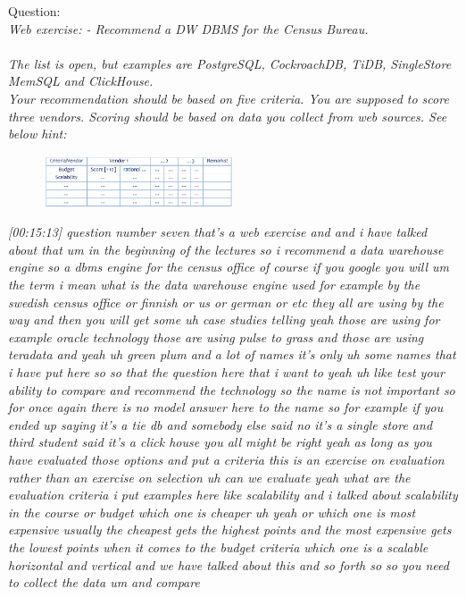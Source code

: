 Question:\\
\emph{
    Web exercise:
- Recommend a DW DBMS for the Census Bureau.\\\\ The list is open, but examples
are PostgreSQL, CockroachDB, TiDB, SingleStore MemSQL and ClickHouse.\\ Your
recommendation should be based on five criteria. You are supposed to score
three vendors. Scoring should be based on data you collect from web sources.
See below hint:
}

\begin{figure}[h] %
    \centering
    \includegraphics[width=0.5\textwidth]{Figures/Q7_QUESTION_table.PNG}
    \label{fig:my_image}
\end{figure}

\emph{[00:15:13] question number seven that's a web exercise and and i have talked about that
um in the beginning of the lectures so i recommend a data warehouse engine so a dbms engine for the
census office of course if you google you will um the term i mean what is the data warehouse engine used
for example by the swedish census office or finnish or us or german or etc they all are using by the way
and then you will get some uh case studies telling yeah those are using for example oracle technology
those are using pulse to grass and those are using teradata and yeah uh green plum and a lot of names
it's only uh some names that i have put here so so that the question here that i want to
yeah uh like test your ability to compare and recommend the technology so the name is not important so for
once again there is no model answer here to the name so for example if you ended up saying it's a tie db
and somebody else said no it's a single store and third student said it's a click house you all might
be right yeah as long as you have evaluated those options and put a criteria this is an exercise on
evaluation rather than an exercise on selection uh can we evaluate yeah what are the evaluation criteria
i put examples here like scalability and i talked about scalability in the course
or budget which one is cheaper uh yeah or which one is most expensive usually the cheapest gets the
highest points and the most expensive gets the lowest points when it comes to the budget criteria
which one is a scalable horizontal and vertical and we have talked about this and so forth so so you need
to collect the data um and compare}\\

